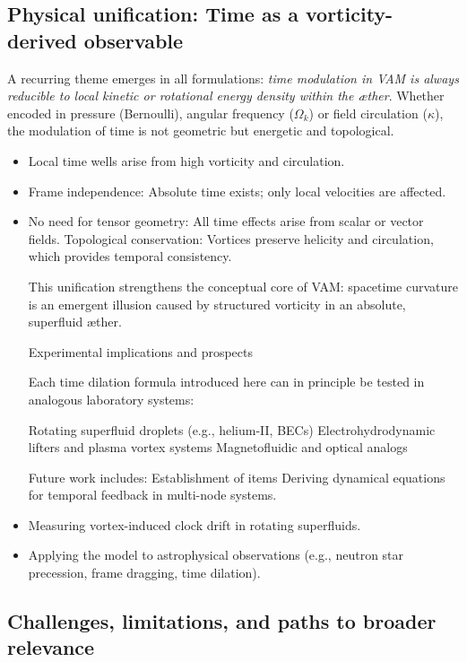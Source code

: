 \subsection{Physical unification: Time as a vorticity-derived observable}

A recurring theme emerges in all formulations: \textit{time modulation in VAM is always reducible to local kinetic or rotational energy density within the æther}. Whether encoded in pressure (Bernoulli), angular frequency (\( \Omega_k \)) or field circulation (\( \kappa \)), the modulation of time is not geometric but energetic and topological.

\begin{itemize}
    \item Local time wells arise from high vorticity and circulation.
    \item Frame independence: Absolute time exists; only local velocities are affected.
    \item No need for tensor geometry: All time effects arise from scalar or vector fields.
    Topological conservation: Vortices preserve helicity and circulation, which provides temporal consistency.

    This unification strengthens the conceptual core of VAM: spacetime curvature is an emergent illusion caused by structured vorticity in an absolute, superfluid æther.

    Experimental implications and prospects

    Each time dilation formula introduced here can in principle be tested in analogous laboratory systems:

    Rotating superfluid droplets (e.g., helium-II, BECs)
    Electrohydrodynamic lifters and plasma vortex systems
    Magnetofluidic and optical analogs

    Future work includes:
    Establishment of items
    Deriving dynamical equations for temporal feedback in multi-node systems. \item Measuring vortex-induced clock drift in rotating superfluids.

    \item Applying the model to astrophysical observations (e.g., neutron star precession, frame dragging, time dilation).
\end{itemize}

\subsection{Challenges, limitations, and paths to broader relevance}

